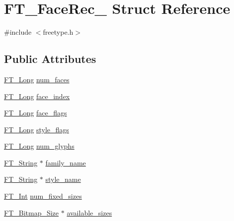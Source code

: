 \hypertarget{struct_f_t___face_rec__}{\section{F\-T\-\_\-\-Face\-Rec\-\_\- Struct Reference}
\label{struct_f_t___face_rec__}
}


{\ttfamily \#include $<$freetype.\-h$>$}

\subsection*{Public Attributes}
\begin{DoxyCompactItemize}
\item 
\hyperlink{fttypes_8h_a7fa72a1f0e79fb1860c5965789024d6f}{F\-T\-\_\-\-Long} \hyperlink{struct_f_t___face_rec___af28be4cba102baaeb09d8e24b71e88fe}{num\-\_\-faces}
\item 
\hyperlink{fttypes_8h_a7fa72a1f0e79fb1860c5965789024d6f}{F\-T\-\_\-\-Long} \hyperlink{struct_f_t___face_rec___ab9a5640eb25bd3c743b3d725edd68a87}{face\-\_\-index}
\item 
\hyperlink{fttypes_8h_a7fa72a1f0e79fb1860c5965789024d6f}{F\-T\-\_\-\-Long} \hyperlink{struct_f_t___face_rec___af1596857ebc9f8eac4c4b51c8f3ffd31}{face\-\_\-flags}
\item 
\hyperlink{fttypes_8h_a7fa72a1f0e79fb1860c5965789024d6f}{F\-T\-\_\-\-Long} \hyperlink{struct_f_t___face_rec___ab06fc56f19fc1bf51cbed9bd621d3835}{style\-\_\-flags}
\item 
\hyperlink{fttypes_8h_a7fa72a1f0e79fb1860c5965789024d6f}{F\-T\-\_\-\-Long} \hyperlink{struct_f_t___face_rec___a58348bc3e0e113e8c73de9c318a9bd7a}{num\-\_\-glyphs}
\item 
\hyperlink{fttypes_8h_a9846214585359eb2ba6bbb0e6de30639}{F\-T\-\_\-\-String} $\ast$ \hyperlink{struct_f_t___face_rec___ae07b64a64466aa7ae2b9066e9336ac8b}{family\-\_\-name}
\item 
\hyperlink{fttypes_8h_a9846214585359eb2ba6bbb0e6de30639}{F\-T\-\_\-\-String} $\ast$ \hyperlink{struct_f_t___face_rec___abd855b9e48b1f377b22176fb97668d7b}{style\-\_\-name}
\item 
\hyperlink{fttypes_8h_af90e5fb0d07e21be9fe6faa33f02484c}{F\-T\-\_\-\-Int} \hyperlink{struct_f_t___face_rec___aa652af958546eb8edf87ccd4b697bfdf}{num\-\_\-fixed\-\_\-sizes}
\item 
\hyperlink{freetype_8h_a6905fdea05db62fabe3ed448cbf6778b}{F\-T\-\_\-\-Bitmap\-\_\-\-Size} $\ast$ \hyperlink{struct_f_t___face_rec___a563ca9007f754aa0f711ba67050f3e47}{available\-\_\-sizes}

\end{DoxyCompactItemize}

